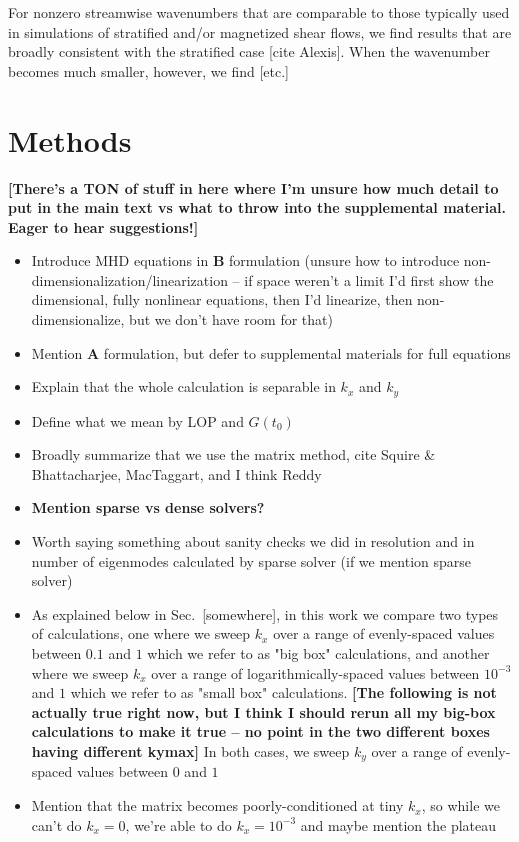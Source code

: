 \documentclass[%
 reprint,
 amsmath,amssymb,
 aps,
]{revtex4-2}
\begin{document}
For nonzero streamwise wavenumbers that are comparable to those typically used in simulations of stratified and/or magnetized shear flows, we find results that are broadly consistent with the stratified case [cite Alexis]. When the wavenumber becomes much smaller, however, we find [etc.]


\section{Methods}
\textbf{[There's a TON of stuff in here where I'm unsure how much detail to put in the main text vs what to throw into the supplemental material. Eager to hear suggestions!]}
    \begin{itemize}
        \item Introduce MHD equations in $\mathbf{B}$ formulation (unsure how to introduce non-dimensionalization/linearization -- if space weren't a limit I'd first show the dimensional, fully nonlinear equations, then I'd linearize, then non-dimensionalize, but we don't have room for that)
        \item Mention $\mathbf{A}$ formulation, but defer to supplemental materials for full equations
        \item Explain that the whole calculation is separable in $k_x$ and $k_y$ 
        \item Define what we mean by LOP and $G(t_0)$
        \item Broadly summarize that we use the matrix method, cite Squire \& Bhattacharjee, MacTaggart, and I think Reddy
        \item \textbf{Mention sparse vs dense solvers?}
        \item Worth saying something about sanity checks we did in resolution and in number of eigenmodes calculated by sparse solver (if we mention sparse solver)
        \item As explained below in Sec.~[somewhere], in this work we compare two types of calculations, one where we sweep $k_x$ over a range of evenly-spaced values between $0.1$ and $1$ which we refer to as "big box" calculations, and another where we sweep $k_x$ over a range of logarithmically-spaced values between $10^{-3}$ and $1$ which we refer to as "small box" calculations. \textbf{[The following is not actually true right now, but I think I should rerun all my big-box calculations to make it true -- no point in the two different boxes having different kymax]} In both cases, we sweep $k_y$ over a range of evenly-spaced values between $0$ and $1$
        \item Mention that the matrix becomes poorly-conditioned at tiny $k_x$, so while we can't do $k_x = 0$, we're able to do $k_x = 10^{-3}$ and maybe mention the plateau
    \end{itemize}
\end{document}

